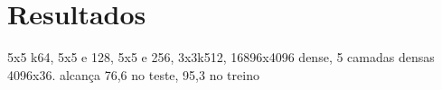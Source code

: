 \chapter{Resultados} \label{resultados}




\cite{otaro}
5x5 k64, 5x5 e 128, 5x5 e 256, 3x3k512, 16896x4096 dense, 5 camadas densas 4096x36. alcança 76,6 no teste, 95,3 no treino
